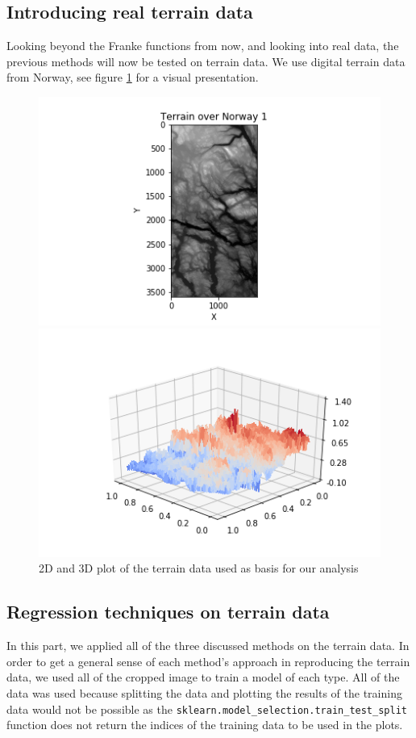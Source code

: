 \documentclass{article}
\begin{document}
\clearpage
\subsection{Introducing real terrain data}
Looking beyond the Franke functions from now, and looking into real data, the previous methods will now be tested on terrain data. We use digital terrain data from Norway, see figure \ref{terraindata} for a visual presentation. 
\begin{figure}[h]
\begin{minipage}{0.48\textwidth}
\centering
\includegraphics[width=1.5\linewidth]{terrain2dplot.png}
\end{minipage}
\begin{minipage}{\textwidth}

\includegraphics[width=0.7\linewidth]{rawdataplot.png}
\end{minipage}
\caption{2D and 3D plot of the terrain data used as basis for our analysis}
\label{terraindata}
\end{figure}

\clearpage
\subsection{Regression techniques on terrain data}
In this part, we applied all of the three discussed methods on the terrain data. In order to get a general sense of each method's approach in reproducing the terrain data, we used all of the cropped image to train a model of each type. All of the data was used because splitting the data and plotting the results of the training data would not be possible as the \verb+sklearn.model_selection.train_test_split+ function does not return the indices of the training data to be used in the plots.
\end{document}

